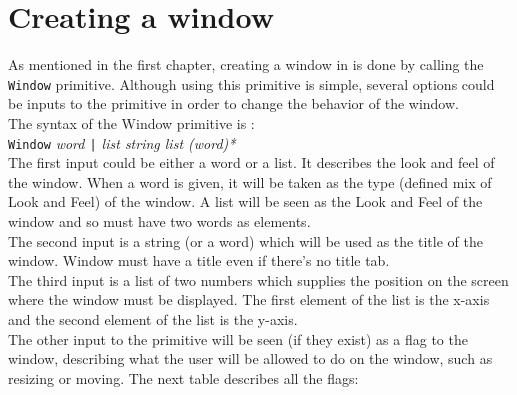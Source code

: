 \section{Creating a window}

As mentioned in the first chapter, creating a window in \squirrel is done by calling the {\tt Window} primitive. Although using this primitive is simple, several options could be inputs to the primitive in order to change the behavior of the window.\\

The syntax of the Window primitive is : \\

{\tt Window} {\it word \verb+|+ list string list (word)*} \\

The first input could be either a word or a list. It describes the look and feel of the window. When a word is given, it will be taken as the type (defined mix of Look and Feel) of the window. A list will be seen as the Look and Feel of the window and so must have two words as elements.\\

The second input is a string (or a word) which will be used as the title of the window. Window must have a title even if there's no title tab.\\

The third input is a list of two numbers which supplies the position on the screen where the window must be displayed. The first element of the list is the x-axis and the second element of the list is the y-axis.\\

The other input to the primitive will be seen (if they exist) as a flag to the window, describing what the user will be allowed to do on the window, such as resizing or moving. The next table describes all the flags:


